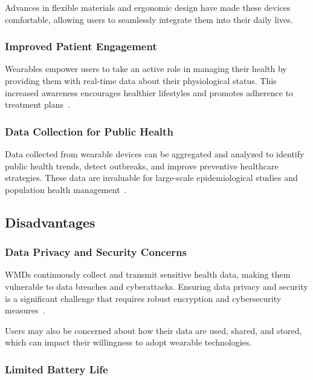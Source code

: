 \documentclass[journal]{IEEEtran}
\begin{document}
        Advances in flexible materials and ergonomic design have made these devices comfortable, allowing users to seamlessly integrate them into their daily lives.

        \subsubsection{Improved Patient Engagement}

        Wearables empower users to take an active role in managing their health by providing them with real-time data about their physiological status. This increased awareness encourages healthier lifestyles and promotes adherence to treatment plans~\cite{Iqbal2016}.

        \subsubsection{Data Collection for Public Health}

        Data collected from wearable devices can be aggregated and analyzed to identify public health trends, detect outbreaks, and improve preventive healthcare strategies. These data are invaluable for large-scale epidemiological studies and population health management~\cite{Cusack2024}.

    \subsection{Disadvantages}

        \subsubsection{Data Privacy and Security Concerns}

        WMDs continuously collect and transmit sensitive health data, making them vulnerable to data breaches and cyberattacks. Ensuring data privacy and security is a significant challenge that requires robust encryption and cybersecurity measures~\cite{Iqbal2016}.

        Users may also be concerned about how their data are used, shared, and stored, which can impact their willingness to adopt wearable technologies.

        \subsubsection{Limited Battery Life}
\end{document}
